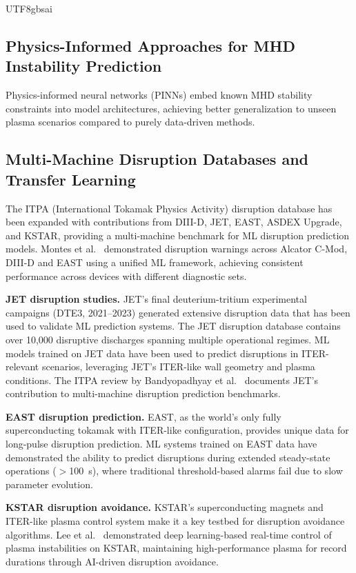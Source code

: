 \documentclass[12pt,a4paper]{article}
\begin{document}
\begin{CJK}{UTF8}{gbsai}
\subsection{Physics-Informed Approaches for MHD Instability Prediction}

Physics-informed neural networks (PINNs) embed known MHD stability constraints into model architectures, achieving better generalization to unseen plasma scenarios compared to purely data-driven methods.

\subsection{Multi-Machine Disruption Databases and Transfer Learning}

The ITPA (International Tokamak Physics Activity) disruption database has been expanded with contributions from DIII-D, JET, EAST, ASDEX Upgrade, and KSTAR, providing a multi-machine benchmark for ML disruption prediction models. Montes et al.~\citep{Rea2018} demonstrated disruption warnings across Alcator C-Mod, DIII-D and EAST using a unified ML framework, achieving consistent performance across devices with different diagnostic sets.

\textbf{JET disruption studies.} JET's final deuterium-tritium experimental campaigns (DTE3, 2021--2023) generated extensive disruption data that has been used to validate ML prediction systems. The JET disruption database contains over 10,000 disruptive discharges spanning multiple operational regimes. ML models trained on JET data have been used to predict disruptions in ITER-relevant scenarios, leveraging JET's ITER-like wall geometry and plasma conditions. The ITPA review by Bandyopadhyay et al.~\citep{Bandyopadhyay2025} documents JET's contribution to multi-machine disruption prediction benchmarks.

\textbf{EAST disruption prediction.} EAST, as the world's only fully superconducting tokamak with ITER-like configuration, provides unique data for long-pulse disruption prediction. ML systems trained on EAST data have demonstrated the ability to predict disruptions during extended steady-state operations ($>$100~s), where traditional threshold-based alarms fail due to slow parameter evolution.

\textbf{KSTAR disruption avoidance.} KSTAR's superconducting magnets and ITER-like plasma control system make it a key testbed for disruption avoidance algorithms. Lee et al.~\citep{Lee2025Nature} demonstrated deep learning-based real-time control of plasma instabilities on KSTAR, maintaining high-performance plasma for record durations through AI-driven disruption avoidance.


\end{CJK}
\end{document}
